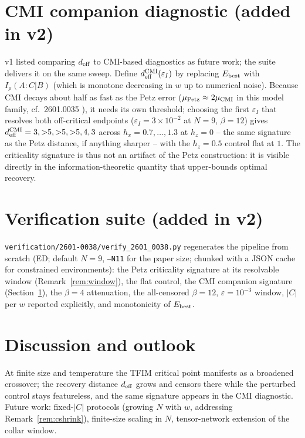 \documentclass[11pt]{article}
\theoremstyle{remark}
\newcommand{\deff}{d_{\rm eff}}
\begin{document}
\section{CMI companion diagnostic (added in v2)}
\label{sec:cmi}
v1 listed comparing $\deff$ to CMI-based diagnostics as future work; the
suite delivers it on the same sweep. Define $\deff^{\rm CMI}
(\varepsilon_I)$ by replacing $E_{\rm best}$ with $I_\rho(A:C|B)$ (which
is monotone decreasing in $w$ up to numerical noise). Because CMI decays
about half as fast as the Petz error ($\mu_{\rm Petz} \approx 2\mu_{\rm
CMI}$ in this model family, cf.\ 2601.0035 \cite{S0035}), it needs its
own threshold; choosing the first $\varepsilon_I$ that resolves both
off-critical endpoints ($\varepsilon_I = 3\times 10^{-2}$ at $N = 9$,
$\beta = 12$) gives $\deff^{\rm CMI} = 3, {>}5, {>}5, {>}5, 4, 3$ across
$h_x = 0.7, \dots, 1.3$ at $h_z = 0$ -- the same signature as the Petz
distance, if anything sharper -- with the $h_z = 0.5$ control flat at
$1$. The criticality signature is thus not an artifact of the Petz
construction: it is visible directly in the information-theoretic
quantity that upper-bounds optimal recovery.

\section{Verification suite (added in v2)}
\texttt{verification/2601-0038/verify\_2601\_0038.py} regenerates the
pipeline from scratch (ED; default $N = 9$, \texttt{--N11} for the paper
size; chunked with a JSON cache for constrained environments): the Petz
criticality signature at its resolvable window (Remark~\ref{rem:window}),
the flat control, the CMI companion signature (Section~\ref{sec:cmi}),
the $\beta = 4$ attenuation, the all-censored $\beta = 12$,
$\varepsilon = 10^{-3}$ window, $|C|$ per $w$ reported explicitly, and
monotonicity of $E_{\rm best}$.

\section{Discussion and outlook}
At finite size and temperature the TFIM critical point manifests as a
broadened crossover; the recovery distance $\deff$ grows and censors
there while the perturbed control stays featureless, and the same
signature appears in the CMI diagnostic. Future work: fixed-$|C|$
protocols (growing $N$ with $w$, addressing Remark~\ref{rem:cshrink}),
finite-size scaling in $N$, tensor-network extension of the collar
window.
\end{document}

